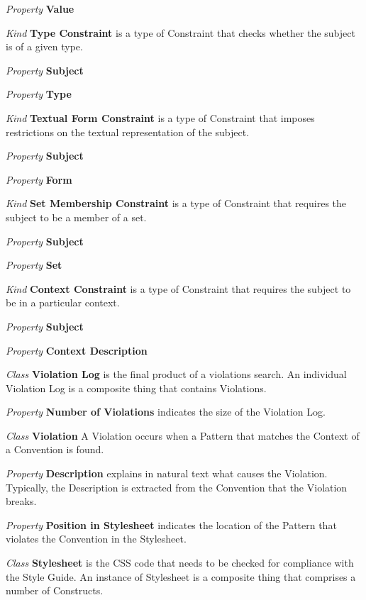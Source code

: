\documentclass[parskip=full]{uvamscse}
\begin{document}
\begin{description}
\textit{Property} \textbf{Value}


\item\textit{Kind} \textbf{Type Constraint} is a type of Constraint that checks whether the subject is of a given type.

\textit{Property} \textbf{Subject} 

\textit{Property} \textbf{Type}


\item\textit{Kind} \textbf{Textual Form Constraint} is a type of Constraint that imposes restrictions on the textual representation of the subject.

\textit{Property} \textbf{Subject} 

\textit{Property} \textbf{Form}


\item\textit{Kind} \textbf{Set Membership Constraint} is a type of Constraint that requires the subject to be a member of a set.

\textit{Property} \textbf{Subject} 

\textit{Property} \textbf{Set}


\item\textit{Kind} \textbf{Context Constraint} is a type of Constraint that requires the subject to be in a particular context.

\textit{Property} \textbf{Subject} 

\textit{Property} \textbf{Context Description}


\item\textit{Class} \textbf{Violation Log} is the final product of a violations search. An individual Violation Log is a composite thing that contains Violations.

\textit{Property} \textbf{Number of Violations} indicates the size of the Violation Log. 


\item\textit{Class} \textbf{Violation} A Violation occurs when a Pattern that matches the Context of a Convention is found.

\textit{Property} \textbf{Description} explains in natural text what causes the Violation. Typically, the Description is extracted from the Convention that the Violation breaks.

\textit{Property} \textbf{Position in Stylesheet} indicates the location of the Pattern that violates the Convention in the Stylesheet. 


\item\textit{Class} \textbf{Stylesheet} is the CSS code that needs to be checked for compliance with the Style Guide. An instance of Stylesheet is a composite thing that comprises a number of Constructs.



\end{description}
\end{document}

